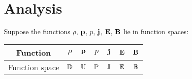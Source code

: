 \section{Analysis}

    Suppose the functions $\rho$, $\mathbf{p}$, $p$, $\mathbf{j}$, $\mathbf{E}$, $\mathbf{B}$ lie in function spaces: 
    \begin{center}\begin{tabular}{ c || c c c | c | c c }
        Function  &  $\rho$  &  $\mathbf{p}$  &  $p$  &  $\mathbf{j}$  &  $\mathbf{E}$  &  $\mathbf{B}$  \\
        \hline
        Function space  &  $\mathbb{D}$  &  $\mathbb{U}$  &  $\mathbb{P}$  &  $\mathbb{J}$  &  $\mathbb{E}$  &  $\mathbb{B}$  \\
    \end{tabular}\end{center}


    
    
